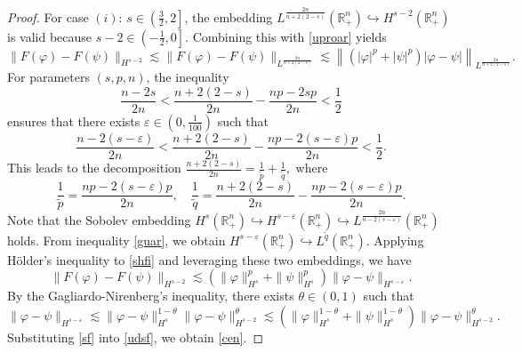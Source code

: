 \documentclass[preprint,compress,12pt]{elsarticle}
\numberwithin{equation}{section}
\begin{document}
\begin{proof}		For case $(i)$: $s \in \left(\frac{3}{2},2\right]$, the embedding $L^{\frac{2n}{n+2(2-s)}}(\mathbb{R}_{+}^{n})\hookrightarrow H^{s-2}(\mathbb{R}_{+}^{n})$  is valid because $s-2\in \left(-\frac{1}{2},0\right]$. Combining this with \eqref{uproar} yields
	\begin{equation}\label{shfi}
		\|F(\varphi)-F(\psi)\|_{H^{s-2}}\lesssim \|F(\varphi)-F(\psi)\|_{L^{\frac{2n}{n+2(2-s)}}}\lesssim
		\left\|\left(|\varphi|^{p}+|\psi|^{p}\right)\left|\varphi-\psi\right|\right\|_{L^{\frac{2n}{n+2(2-s)}}}.
	\end{equation}
	For parameters $(s,p,n)$, the inequality
	\begin{equation*}
		\frac{n-2s}{2n}<\frac{n+2(2-s)}{2n}-\frac{np-2s p}{2n}<\frac{1}{2}
	\end{equation*}
	ensures that there exists $\varepsilon\in \left(0,\frac{1}{100}\right)$ such that
	\begin{equation}\label{guar}		\frac{n-2(s-\varepsilon)}{2n}<\frac{n+2(2-s)}{2n}-\frac{np-2(s-\varepsilon)p}{2n}<\frac{1}{2}.
	\end{equation}
	This leads to the decomposition
	$\frac{n+2(2-s)}{2n}=\frac{1}{\tilde{p}}+\frac{1}{\tilde{q}},$ where
	\begin{equation*}
		\frac{1}{\tilde{p}}=\frac{np-2(s-\varepsilon)p}{2n},\quad \frac{1}{\tilde{q}}=\frac{n+2(2-s)}{2n}-\frac{np-2(s-\varepsilon)p}{2n}.
	\end{equation*}
	Note that the Sobolev embedding $H^{s}(\mathbb{R}_{+}^{n})\hookrightarrow H^{s-\varepsilon}(\mathbb{R}_{+}^{n})\hookrightarrow L^{\frac{2n}{n-2(s-\varepsilon)}}(\mathbb{R}_{+}^{n})$ holds. From  inequality \eqref{guar}, we obtain $H^{s-\varepsilon}(\mathbb{R}_{+}^{n})\hookrightarrow L^{\tilde{q}}(\mathbb{R}_{+}^{n})$. Applying H\"{o}lder's inequality to \eqref{shfi} and leveraging these two embeddings, we have
	\begin{equation}\label{udsf}
		\|F(\varphi)-F(\psi)\|_{H^{s-2}}\lesssim \left(\|\varphi\|_{H^{s}}^{p}+\|\psi\|_{H^{s}}^{p}\right)\|\varphi-\psi\|_{H^{s-\varepsilon}}.
	\end{equation}
	By the Gagliardo-Nirenberg's inequality, there exists $\theta\in (0,1)$ such that
	\begin{equation}\label{sf}
		\|\varphi-\psi\|_{H^{s-\varepsilon}}\lesssim \|\varphi-\psi\|_{H^{s}}^{1-\theta} \|\varphi-\psi\|_{H^{s-2}}^{\theta}\lesssim\left( \|\varphi\|_{H^{s}}^{1-\theta} +\|\psi\|_{H^{s}}^{1-\theta}\right)\|\varphi-\psi\|_{H^{s-2}}^{\theta}.
	\end{equation}
	Substituting \eqref{sf} into \eqref{udsf}, we obtain \eqref{cen}.
	

\end{proof}
\end{document}
